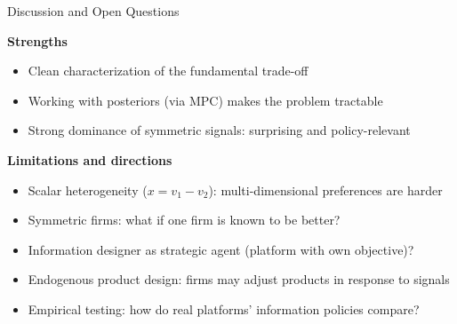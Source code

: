\documentclass[aspectratio=169, 11pt]{beamer}
\begin{document}
\begin{frame}{Discussion and Open Questions}

\textbf{Strengths}
\begin{itemize}
    \item Clean characterization of the fundamental trade-off
    \item Working with posteriors (via MPC) makes the problem tractable
    \item Strong dominance of symmetric signals: surprising and policy-relevant
\end{itemize}

\bigskip

\textbf{Limitations and directions}
\begin{itemize}
    \item Scalar heterogeneity ($x = v_1 - v_2$): multi-dimensional preferences are harder
    \item Symmetric firms: what if one firm is known to be better?
    \item Information designer as strategic agent (platform with own objective)?
    \item Endogenous product design: firms may adjust products in response to signals
    \item Empirical testing: how do real platforms' information policies compare?
\end{itemize}

\end{frame}
\end{document}
